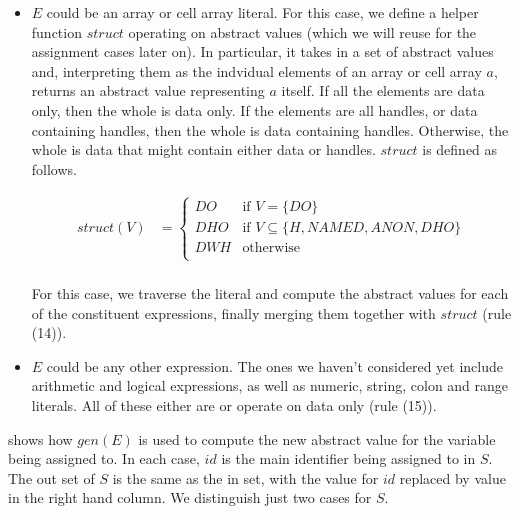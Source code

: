 \begin{itemize}
  \item $E$ could be an array or cell array literal. For this case, we define a
    helper function $struct$ operating on abstract values (which we will reuse
    for the assignment cases later on). In particular, it takes in a set of
    abstract values and, interpreting them as the indvidual elements of an
    array or cell array $a$, returns an abstract value representing $a$ itself.
    If all the elements are data only, then the whole is data only. If the
    elements are all handles, or data containing handles, then the whole is
    data containing handles. Otherwise, the whole is data that might contain
    either data or handles. $struct$ is defined as follows.

\begin{align*}
struct(V) &= \begin{cases}
  DO & \text{if } V = \lbrace DO \rbrace \\
  DHO & \text{if } V \subseteq \lbrace H, NAMED, ANON, DHO \rbrace \\
  DWH & \text{otherwise} \\
\end{cases} \\
\end{align*}

    For this case, we traverse the literal and compute the abstract values for
    each of the constituent expressions, finally merging them together with
    $struct$ (rule (14)).

  \item $E$ could be any other expression. The ones we haven't considered yet
    include arithmetic and logical expressions, as well as numeric, string,
    colon and range literals. All of these either are or operate on data only
    (rule (15)).

\end{itemize}

 shows how $gen(E)$ is used to compute the new
abstract value for the variable being assigned to. In each case, $id$ is the
main identifier being assigned to in $S$. The out set of $S$ is the same as the
in set, with the value for $id$ replaced by value in the right hand column. We
distinguish just two cases for $S$.

